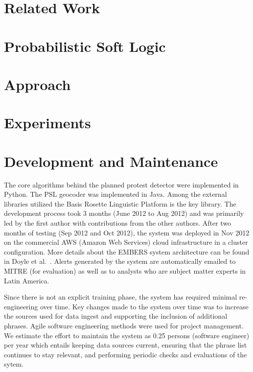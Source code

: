 \documentclass[letterpaper]{article}
\begin{document}
\section{Related Work}


\section{Probabilistic Soft Logic}

\label{section:PSL}

\section{Approach}


\section{Experiments}


\section{Development and Maintenance}
The core algorithms behind the
planned protest detector were implemented in Python. The PSL geocoder was
implemented in Java. Among the external libraries utilized the Basis Rosette Linguistic Platform is the key
library. The development process took 3 months (June
2012 to Aug 2012) and was
primarily led by the first author with contributions from the other authors.
After two months of testing (Sep 2012 and Oct 2012), the system was deployed
in Nov 2012 on the commercial AWS (Amazon
Web Services) cloud infrastructure in a cluster configuration. 
More details about the EMBERS 
system architecture can be found in
Doyle et al.~. Alerts
generated by the system are automatically emailed to MITRE (for evaluation)
as well as to analysts who are subject matter experts in Latin America.

Since there is not an explicit training
phase, the system has required minimal re-engineering over time. Key changes
made to the system over time was to increase the sources used for data ingest
and supporting the inclusion of additional phrases. Agile software
engineering methods were used for project management. We estimate the
effort to maintain the system as 0.25 persons (software engineer) per year
which entails keeping data sources current, ensuring that
the phrase list continues to stay relevant, and performing periodic 
checks and evaluations of the sytem.
\end{document}
